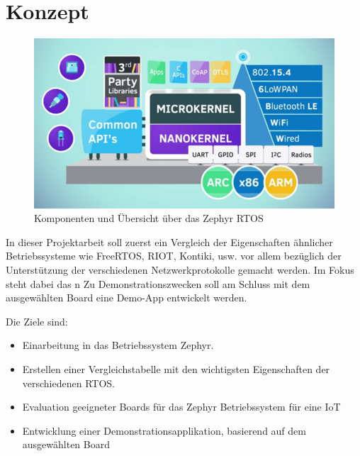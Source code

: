 \chapter{Konzept}
\label{chap:konzept}

\begin{figure}[h]
	\centering
	\includegraphics[width=0.7\linewidth]{bilder/zephyr_components.jpg}
	\caption{Komponenten und Übersicht über das Zephyr RTOS}
	\label{fig:components}
\end{figure}

In dieser Projektarbeit soll zuerst ein Vergleich der Eigenschaften ähnlicher
Betriebssysteme wie FreeRTOS, RIOT, Kontiki, usw. vor allem bezüglich der Unterstützung der
verschiedenen Netzwerkprotokolle gemacht werden. Im Fokus steht dabei das n
Zu Demonstrationszwecken soll am Schluss mit dem ausgewählten Board eine Demo-App entwickelt werden.

Die Ziele sind:

\begin{itemize}
	\item Einarbeitung in das Betriebssystem Zephyr.
	\item Erstellen einer Vergleichstabelle mit den wichtigsten Eigenschaften der verschiedenen
	RTOS.
	\item Evaluation geeigneter Boards für das Zephyr Betriebssystem für eine IoT
	\item Entwicklung einer Demonstrationsapplikation, basierend auf dem ausgewählten Board
\end{itemize}
